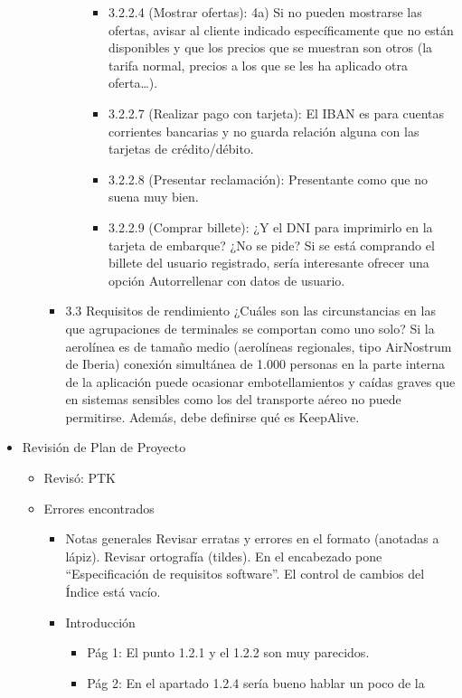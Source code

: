 \documentclass[11pt, a4paper, twoside, titlepage]{article}
\begin{document}
\begin{itemize}
\begin{itemize}
\begin{itemize}
\begin{itemize}
\begin{itemize}
									\item 3.2.2.4 (Mostrar ofertas): 4a) Si no pueden mostrarse las ofertas, avisar al cliente indicado específicamente que no están disponibles y que los precios que se muestran son otros (la tarifa normal, precios a los que se les ha aplicado otra oferta…). 
									\item 3.2.2.7 (Realizar pago con tarjeta): El IBAN es para cuentas corrientes bancarias y no guarda relación alguna con las tarjetas de crédito/débito. 
									\item 3.2.2.8 (Presentar reclamación): Presentante como que no suena muy bien. 
									\item 3.2.2.9 (Comprar billete): ¿Y el DNI para imprimirlo en la tarjeta de embarque? ¿No se pide? Si se está comprando el billete del usuario registrado, sería interesante ofrecer una opción Autorrellenar con datos de usuario.
									\end{itemize}
								\end{itemize}
							\item  3.3 Requisitos de rendimiento 
								¿Cuáles son las circunstancias en las que agrupaciones de terminales se comportan como uno solo? Si la aerolínea es de tamaño medio (aerolíneas regionales, tipo AirNostrum de Iberia) conexión simultánea de 1.000 personas en la parte interna de la aplicación puede ocasionar embotellamientos y caídas graves que en sistemas sensibles como los del transporte aéreo no puede permitirse. Además, debe definirse qué es KeepAlive.
						\end{itemize}
				\end{itemize}
			\item Revisión de Plan de Proyecto 
				\begin{itemize}
					\item Revisó: PTK
					\item Errores encontrados 
						\begin{itemize}
							\item Notas generales 
								Revisar erratas y errores en el formato (anotadas a lápiz). Revisar ortografía  (tildes). En el encabezado pone “Especificación de requisitos software”. El control de cambios del Índice está vacío.  
							\item Introducción
								\begin{itemize}
								\item Pág  1:  El  punto  1.2.1  y  el  1.2.2  son  muy  parecidos.  
								\item Pág  2:  En  el  apartado  1.2.4  sería  bueno  hablar  un  poco  de  la  

\end{itemize}
\end{itemize}
\end{itemize}
\end{itemize}
\end{document}
